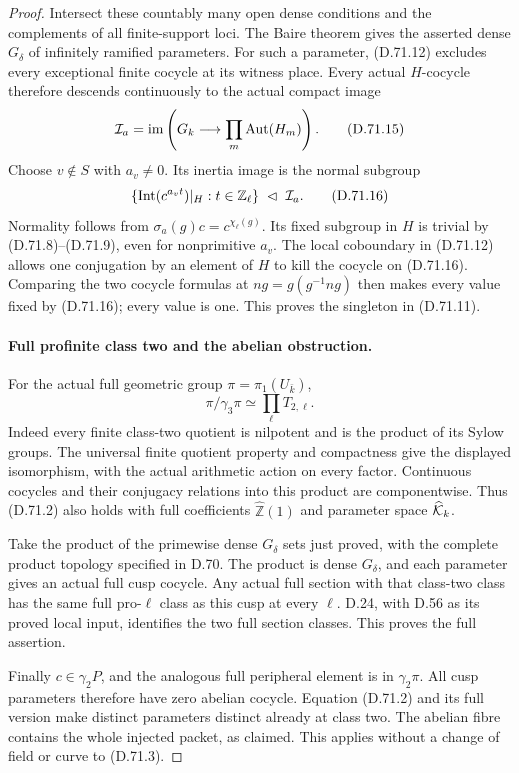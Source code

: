 \begin{proof}
Intersect these countably many
open dense conditions and the
complements of all finite-support
loci. The Baire theorem gives
the asserted dense \(G_\delta\)
of infinitely ramified parameters.
For such a parameter, (D.71.12)
excludes every exceptional finite
cocycle at its witness place.
Every actual \(H\)-cocycle
therefore descends continuously
to the actual compact image
\[
 {\cal I}_a=\operatorname{im}\left(
       G_k\longrightarrow\prod_m\operatorname{Aut}(H_m)\right).
                                                        \tag{D.71.15}
\]
Choose \(v\notin S\) with \(a_v\ne0\).
Its inertia image is the normal
subgroup
\[
 \{\operatorname{Int}(c^{a_v t})|_H:t\in\mathbb Z_\ell\}
                    \ \lhd\ {\cal I}_a.                \tag{D.71.16}
\]
Normality follows from
\(\sigma_a(g)c=c^{\chi_\ell(g)}\).
Its fixed subgroup in \(H\)
is trivial by (D.71.8)--(D.71.9),
even for nonprimitive \(a_v\).
The local coboundary in (D.71.12)
allows one conjugation by an
element of \(H\) to kill the
cocycle on (D.71.16). Comparing
the two cocycle formulas at
\(ng=g(g^{-1}ng)\) then makes
every value fixed by (D.71.16);
every value is one. This proves
the singleton in (D.71.11).

\paragraph{Full profinite class two and the abelian obstruction.}
For the actual full geometric
group \(\pi=\pi_1(U_{\bar k})\),
\[
             \pi/\gamma_3\pi\simeq\prod_\ell T_{2,\ell}.
                                                        \tag{D.71.17}
\]
Indeed every finite class-two
quotient is nilpotent and is
the product of its Sylow groups.
The universal finite quotient
property and compactness give
the displayed isomorphism,
with the actual arithmetic
action on every factor.
Continuous cocycles and their
conjugacy relations into this
product are componentwise.
Thus (D.71.2) also holds with
full coefficients
\(\widehat{\mathbb Z}(1)\)
and parameter space
\(\widehat{\cal K}_k\).

Take the product of the
primewise dense \(G_\delta\)
sets just proved, with the
complete product topology
specified in D.70. The product
is dense \(G_\delta\), and each
parameter gives an actual
full cusp cocycle. Any actual
full section with that class-two
class has the same full
pro-\(\ell\) class as this
cusp at every \(\ell\).
D.24, with D.56 as its
proved local input, identifies
the two full section classes.
This proves the full assertion.

Finally \(c\in\gamma_2P\), and
the analogous full peripheral
element is in \(\gamma_2\pi\).
All cusp parameters therefore
have zero abelian cocycle.
Equation (D.71.2) and its
full version make distinct
parameters distinct already
at class two. The abelian
fibre contains the whole
injected packet, as claimed.
This applies without a change
of field or curve to (D.71.3).
\end{proof}
